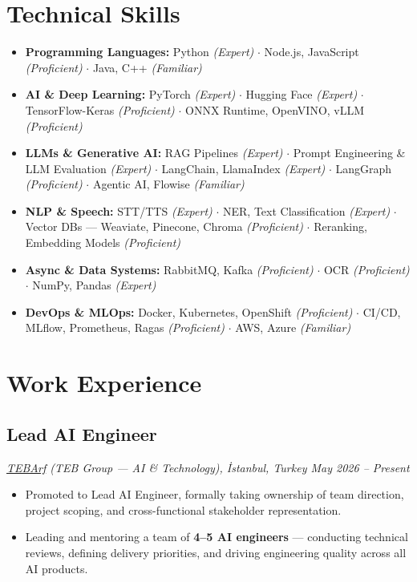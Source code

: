 \documentclass[a4paper,10pt]{article}
\begin{document}
\section{Technical Skills}
\begin{itemize}[label=--,leftmargin=*]
    \item \textbf{Programming Languages:} Python \textit{\small(Expert)} $\cdot$ Node.js, JavaScript \textit{\small(Proficient)} $\cdot$ Java, C++ \textit{\small(Familiar)}
    \item \textbf{AI \& Deep Learning:} PyTorch \textit{\small(Expert)} $\cdot$ Hugging Face \textit{\small(Expert)} $\cdot$ TensorFlow-Keras \textit{\small(Proficient)} $\cdot$ ONNX Runtime, OpenVINO, vLLM \textit{\small(Proficient)}
    \item \textbf{LLMs \& Generative AI:} RAG Pipelines \textit{\small(Expert)} $\cdot$ Prompt Engineering \& LLM Evaluation \textit{\small(Expert)} $\cdot$ LangChain, LlamaIndex \textit{\small(Expert)} $\cdot$ LangGraph \textit{\small(Proficient)} $\cdot$ Agentic AI, Flowise \textit{\small(Familiar)}
    \item \textbf{NLP \& Speech:} STT/TTS \textit{\small(Expert)} $\cdot$ NER, Text Classification \textit{\small(Expert)} $\cdot$ Vector DBs --- Weaviate, Pinecone, Chroma \textit{\small(Proficient)} $\cdot$ Reranking, Embedding Models \textit{\small(Proficient)}
    \item \textbf{Async \& Data Systems:} RabbitMQ, Kafka \textit{\small(Proficient)} $\cdot$ OCR \textit{\small(Proficient)} $\cdot$ NumPy, Pandas \textit{\small(Expert)}
    \item \textbf{DevOps \& MLOps:} Docker, Kubernetes, OpenShift \textit{\small(Proficient)} $\cdot$ CI/CD, MLflow, Prometheus, Ragas \textit{\small(Proficient)} $\cdot$ AWS, Azure \textit{\small(Familiar)}
\end{itemize}

\vspace{-0.5cm}
\section{Work Experience}

\subsection{Lead AI Engineer}
\textit{\href{https://www.tebarf.com.tr}{TEBArf} (TEB Group --- AI \& Technology), İstanbul, Turkey \hfill May 2026 -- Present}
\begin{itemize}[label=--,leftmargin=*]
    \item Promoted to Lead AI Engineer, formally taking ownership of team direction, project scoping, and cross-functional stakeholder representation.
    \item Leading and mentoring a team of \textbf{4--5 AI engineers} --- conducting technical reviews, defining delivery priorities, and driving engineering quality across all AI products.
\end{itemize}
\end{document}
